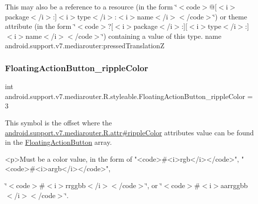 This may also be a reference to a resource (in the form \char`\"{}$<$code$>$@\mbox{[}$<$i$>$package$<$/i$>$\+:\mbox{]}$<$i$>$type$<$/i$>$\+:$<$i$>$name$<$/i$>$$<$/code$>$\char`\"{}) or theme attribute (in the form \char`\"{}$<$code$>$?\mbox{[}$<$i$>$package$<$/i$>$\+:\mbox{]}\mbox{[}$<$i$>$type$<$/i$>$\+:\mbox{]}$<$i$>$name$<$/i$>$$<$/code$>$\char`\"{}) containing a value of this type.  name android.\+support.\+v7.\+mediarouter\+:pressed\+TranslationZ \mbox{\label{classandroid_1_1support_1_1v7_1_1mediarouter_1_1R_1_1styleable_aa1f3b200711d78334f340170979ae709}} 
\subsubsection{\texorpdfstring{Floating\+Action\+Button\+\_\+ripple\+Color}{FloatingActionButton\_rippleColor}}
{\footnotesize\ttfamily int android.\+support.\+v7.\+mediarouter.\+R.\+styleable.\+Floating\+Action\+Button\+\_\+ripple\+Color = 3\hspace{0.3cm}{\ttfamily [static]}}

This symbol is the offset where the \hyperlink{classandroid_1_1support_1_1v7_1_1mediarouter_1_1R_1_1attr_a59f40623f4a63402618d7afbde45845f}{android.\+support.\+v7.\+mediarouter.\+R.\+attr\#ripple\+Color} attribute\textquotesingle{}s value can be found in the \hyperlink{classandroid_1_1support_1_1v7_1_1mediarouter_1_1R_1_1styleable_ae665bad1758a0b708ec034929b76af91}{Floating\+Action\+Button} array.

\begin{DoxyVerb}      <p>Must be a color value, in the form of "<code>#<i>rgb</i></code>", "<code>#<i>argb</i></code>",
\end{DoxyVerb}
 \char`\"{}$<$code$>$\#$<$i$>$rrggbb$<$/i$>$$<$/code$>$\char`\"{}, or \char`\"{}$<$code$>$\#$<$i$>$aarrggbb$<$/i$>$$<$/code$>$\char`\"{}. 

